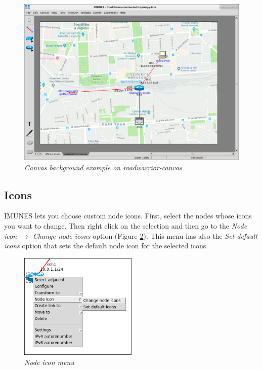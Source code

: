 \begin{figure}[H]
	\centering
	\includegraphics[width=\textwidth]{./images/canvas_background_example_2.png}
	\caption{\emph{Canvas background example on roadwarrior-canvas}}
	\label{fig:canvas_background_example_2}
\end{figure}

\subsection{Icons}
\label{sec:Icons}
IMUNES lets you choose custom node icons. First, select the nodes whose icons
you want to change. Then right click on the selection and then go to the
\emph{Node icon $\to$ Change node icons} option (Figure
\ref{fig:node_icon_menu}). This menu has also the \emph{Set default icons}
option that sets the default node icon for the selected icons.

\begin{figure}[H]
	\centering
	\vspace{10pt}
	\includegraphics[width=0.5\textwidth]{./images/node_icon_menu.png}
	\caption{\emph{Node icon menu}}
	\label{fig:node_icon_menu}
\end{figure}

